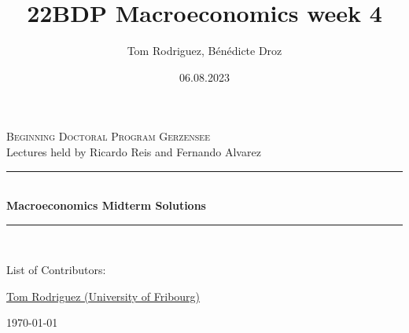 \documentclass[12pt]{article}
\title{22BDP Macroeconomics week 4}
\author{Tom Rodriguez, Bénédicte Droz}
\date{06.08.2023}
\begin{document}
\begin{titlepage}
	
	\newcommand{\HRule}{\rule{\linewidth}{0.5mm}} %
	
	\center %
	
	
	\textsc{\large Beginning Doctoral Program Gerzensee}\\[0.5cm] %
	{\large Lectures held by Ricardo Reis and Fernando Alvarez}\\[1cm] %
	
	
	
	\HRule \\[1.0cm]
	{ \LARGE \bfseries Macroeconomics Midterm Solutions}\\[0.4cm] %
	\HRule \\[2cm]
	
	

	
	\begin{flushleft}
        \Large List of Contributors:
        
		{\large 
            \href{https://rodrigueztom.github.io}{Tom Rodriguez (University of Fribourg)}
        }
	\end{flushleft}
	
	
	
	{\large \today} %
	
	\vfill 
	
\end{titlepage}
\end{document}
